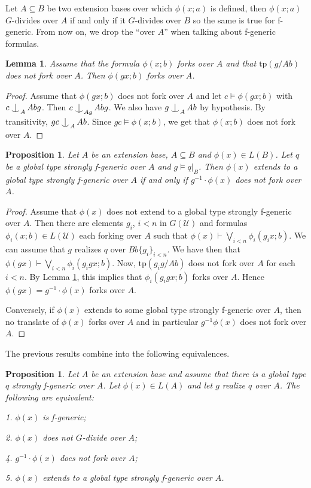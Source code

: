 \documentclass[12pt]{article}
\makeatletter
\newtheorem{prop}[thm]{Proposition}
\newtheorem{lemme}[thm]{Lemma}
\theoremstyle{definition}
\theoremstyle{mystyle}
\theoremstyle{remark}
\newcommand{\monster}{\mathcal U}
\newcommand{\tp}{\mathrm{tp}}
\def\indsym#1#2{%
 \setbox0=\hbox{$\m@th#1x$}%
 \kern\wd0%
 \hbox to 0pt{\hss$\m@th#1\mid$\hbox to 0pt{$\m@th#1^{#2}$\hss}\hss}%
 \lower.9\ht0\hbox to 0pt{\hss$\m@th#1\smile$\hss}%
 \kern\wd0}
\newcommand{\ind}[1][]{\mathop{\mathpalette\indsym{#1}}}
\makeatother
\begin{document}
Let $A\subseteq B$ be two extension bases over which $\phi(x;a)$ is defined, then $\phi(x;a)$ $G$-divides over $A$ if and only if it $G$-divides over $B$ so the same is true for f-generic. From now on, we drop the ``over $A$'' when talking about f-generic formulas.

\begin{lemme}\label{lem_genfork}
Assume that the formula $\phi(x;b)$ forks over $A$ and that $\tp(g/Ab)$ does not fork over $A$. Then $\phi(gx;b)$ forks over $A$.
\end{lemme}

\begin{proof}
Assume that $\phi(gx;b)$ does not fork over $A$ and let $c\models \phi(gx;b)$ with $c\ind_A Abg$. Then $c\ind_{Ag} Abg$. We also have $g \ind_A Ab$ by hypothesis. By transitivity, $gc \ind_A Ab$. Since $gc \models \phi(x;b)$, we get that $\phi(x;b)$ does not fork over $A$.
\end{proof}


\begin{prop}\label{prop_fund2}
Let $A$ be an extension base, $A\subseteq B$ and $\phi(x)\in L(B)$. Let $q$ be a global type strongly f-generic over $A$ and $g\models q|_B$. Then $\phi(x)$ extends to a global type strongly f-generic over $A$ if and only if $g^{-1}\cdot \phi(x)$ does not fork over $A$.
\end{prop}
\begin{proof}
Assume that $\phi(x)$ does not extend to a global type strongly f-generic over $A$. Then there are elements $g_i$, $i<n$ in $G(\monster)$ and formulas $\phi_i(x;b)\in L(\monster)$ each forking over $A$ such that $\phi(x) \vdash \bigvee_{i<n} \phi_i(g_i x; b)$. We can assume that $g$ realizes $q$ over $Bb\{g_i\}_{i<n}$. We have then that $\phi(gx)\vdash \bigvee_{i<n} \phi_i(g_ig x; b)$. Now, $\tp(g_ig/Ab)$ does not fork over $A$  for each $i<n$. By Lemma \ref{lem_genfork}, this implies that $\phi_i(g_ig x;b)$ forks over $A$. Hence $\phi(gx)=g^{-1}\cdot \phi(x)$ forks over $A$.

Conversely, if $\phi(x)$ extends to some global type strongly f-generic over $A$, then no translate of $\phi(x)$ forks over $A$ and in particular $g^{-1}\phi(x)$ does not fork over $A$.
\end{proof}

The previous results combine into the following equivalences.

\begin{prop}\label{prop_fund}
Let $A$ be an extension base and assume that there is a global
type $q$ strongly f-generic over $A$. Let $\phi(x)\in L(A)$ and
let $g$ realize $q$ over $A$. The following are equivalent:

1. $\phi(x)$ is f-generic;

2. $\phi(x)$ does not $G$-divide over $A$;

4. $g^{-1}\cdot \phi(x)$ does not fork over $A$;

5. $\phi(x)$ extends to a global type strongly f-generic over $A$.
\end{prop}
\end{document}
